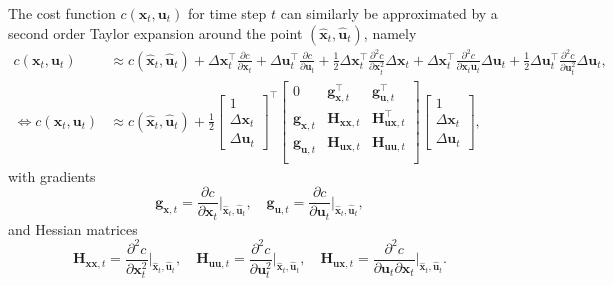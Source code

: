 \documentclass[10pt,a4paper]{article} %
\newcommand{\trsp}{{\scriptscriptstyle\top}}
\begin{document}
The cost function $c(\bm{x}_t,\bm{u}_t)$ for time step $t$ can similarly be approximated by a second order Taylor expansion around the point $(\bm{\hat{x}}_t, \bm{\hat{u}}_t)$, namely
\begin{equation}
\begin{aligned}
	c(\bm{x}_t,\bm{u}_t) &\approx c(\bm{\hat{x}}_t,\bm{\hat{u}}_t) + \Delta\bm{x}_t^\trsp \frac{\partial c}{\partial\bm{x}_t} + 
	\Delta\bm{u}_t^\trsp \frac{\partial c}{\partial\bm{u}_t} +
	\frac{1}{2}\Delta\bm{x}_t^\trsp \frac{\partial^2c}{\partial\bm{x}_t^2} \Delta\bm{x}_t + 
	\Delta\bm{x}_t^\trsp \frac{\partial^2c}{\partial\bm{x}_t\bm{u}_t} \Delta\bm{u}_t +
	\frac{1}{2}\Delta\bm{u}_t^\trsp \frac{\partial^2c}{\partial\bm{u}_t^2} \Delta\bm{u}_t,
	\\
	\iff c(\bm{x}_t,\bm{u}_t) &\approx c(\bm{\hat{x}}_t,\bm{\hat{u}}_t) + 
	\frac{1}{2}
	\begin{bmatrix}
	1 \\ \Delta\bm{x}_t \\ \Delta\bm{u}_t
	\end{bmatrix}^{\!\trsp}
	\begin{bmatrix}
	0 & \bm{g}_{\bm{x},t}^\trsp & \bm{g}_{\bm{u},t}^\trsp \\
	\bm{g}_{\bm{x},t} & \bm{H}_{\bm{x}\bm{x},t} & \bm{H}_{\bm{u}\bm{x},t}^\trsp \\
	\bm{g}_{\bm{u},t} & \bm{H}_{\bm{u}\bm{x},t} & \bm{H}_{\bm{u}\bm{u},t} \\
	\end{bmatrix}
	\begin{bmatrix}
	1 \\ \Delta\bm{x}_t \\ \Delta\bm{u}_t
	\end{bmatrix},
\end{aligned}
\label{eq:dc}
\end{equation}
with gradients 
\begin{equation*}
	\bm{g}_{\bm{x},t}=\frac{\partial c}{\partial\bm{x}_t}\Big|_{\bm{\hat{x}}_t,\bm{\hat{u}}_t}, \quad  
	\bm{g}_{\bm{u},t}=\frac{\partial c}{\partial\bm{u}_t}\Big|_{\bm{\hat{x}}_t,\bm{\hat{u}}_t}, 
\end{equation*}
and Hessian matrices 
\begin{equation*}
	\bm{H}_{\bm{x}\bm{x},t}=\frac{\partial^2c}{\partial\bm{x}_t^2}\Big|_{\bm{\hat{x}}_t,\bm{\hat{u}}_t}, \quad  
	\bm{H}_{\bm{u}\bm{u},t}=\frac{\partial^2c}{\partial\bm{u}_t^2}\Big|_{\bm{\hat{x}}_t,\bm{\hat{u}}_t}, \quad
	\bm{H}_{\bm{u}\bm{x},t}=\frac{\partial^2c}{\partial\bm{u}_t\partial\bm{x}_t}\Big|_{\bm{\hat{x}}_t,\bm{\hat{u}}_t}.
\end{equation*}
\end{document}
